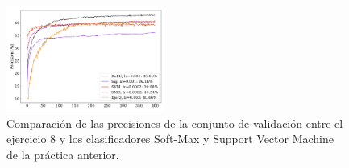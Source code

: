 \begin{figure}[H]
    \begin{small}
        \begin{center}
            \includegraphics[width=0.465\textwidth]{Graphs/ejer8_acc_all.pdf}
        \end{center}
        \caption{Comparación de las precisiones de la conjunto de validación entre el ejercicio 8 y los clasificadores Soft-Max y Support Vector Machine de la práctica anterior.}
        \label{fig:ejer8_acc_all}
    \end{small}
\end{figure}

